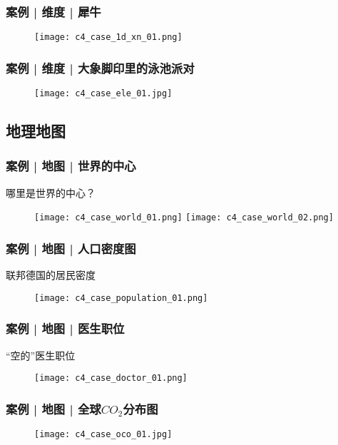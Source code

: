 \begin{frame}
  \frametitle{案例 | 维度 | 犀牛}
  \begin{figure}
    \centering
    \texttt{[image: c4\_case\_1d\_xn\_01.png]}
  \end{figure}
\end{frame}

\begin{frame}
  \frametitle{案例 | 维度 | 大象脚印里的泳池派对}
  \begin{figure}
    \centering
    \texttt{[image: c4\_case\_ele\_01.jpg]}
  \end{figure}
\end{frame}

\subsection{地理地图}
\begin{frame}
  \frametitle{案例 | 地图 | 世界的中心}
  \begin{block}{哪里是世界的中心？}
    \begin{figure}
      \centering
      \texttt{[image: c4\_case\_world\_01.png]}\quad
      \texttt{[image: c4\_case\_world\_02.png]}
    \end{figure}
  \end{block}
\end{frame}

\begin{frame}
  \frametitle{案例 | 地图 | 人口密度图}
  \begin{block}{联邦德国的居民密度}
    \begin{figure}
      \centering
      \texttt{[image: c4\_case\_population\_01.png]}
    \end{figure}
  \end{block}
\end{frame}

\begin{frame}
  \frametitle{案例 | 地图 | 医生职位}
  \begin{block}{“空的”医生职位}
    \begin{figure}
      \centering
      \texttt{[image: c4\_case\_doctor\_01.png]}
    \end{figure}
  \end{block}
\end{frame}

\begin{frame}
  \frametitle{案例 | 地图 | 全球$CO_2$分布图}
    \begin{figure}
      \centering
      \texttt{[image: c4\_case\_oco\_01.jpg]}
    \end{figure}
\end{frame}


